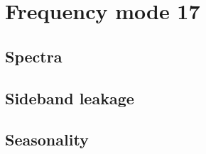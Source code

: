 \section{Frequency mode 17}
\subsection{Spectra}

\subsection{Sideband leakage}

\subsection{Seasonality}

